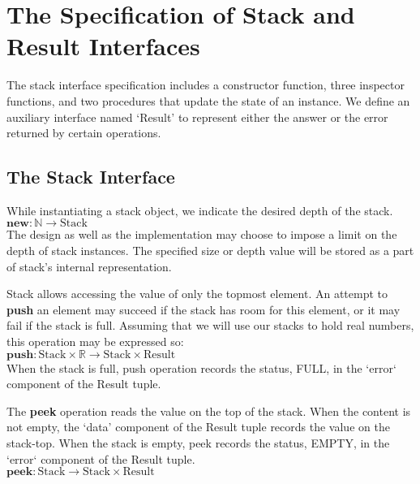 \documentclass[10pt]{article}
\begin{document}
\section{The Specification of Stack and Result Interfaces}
  \noindent The stack interface specification includes a constructor function, three inspector functions, and two procedures that update the state of an instance. We define an auxiliary interface named `Result' to represent either the answer or the error returned by certain operations.   
  
  \subsection{The Stack Interface}
  \noindent While instantiating a stack object, we indicate the desired depth of the stack. 
  \vspace*{6pt}\\\hspace*{32pt}\(
  \textbf{new}: \mathbb{N} \rightarrow \mathrm{Stack}
  \)\vspace*{6pt}\\
  The design as well as the implementation may choose to impose a limit on the depth of stack instances. The specified size or depth value will be stored as a part of stack's internal representation.  

  Stack allows accessing the value of only the topmost element. An attempt to \textbf{push} an element may succeed if the stack has room for this element, or it may fail if the stack is full. Assuming that we will use our stacks to hold real numbers, this operation may be expressed so:
  \vspace*{6pt}\\\hspace*{32pt}\(
  \textbf{push}: \mathrm{Stack} \times \mathbb{R} \rightarrow \mathrm{Stack \times Result}
  \)\vspace*{6pt}\\
  When the stack is full, push operation records the status, FULL, in the `error` component of the Result tuple.

  The \textbf{peek} operation reads the value on the top of the stack. When the content is not empty, the `data' component of the Result tuple records the value on the stack-top. When the stack is empty, peek records the status, EMPTY, in the `error` component of the Result tuple.
  \vspace*{6pt}\\\hspace*{32pt}\(
  \textbf{peek}: \mathrm{Stack} \rightarrow \mathrm{Stack \times Result}
  \)\vspace*{6pt}
\end{document}

